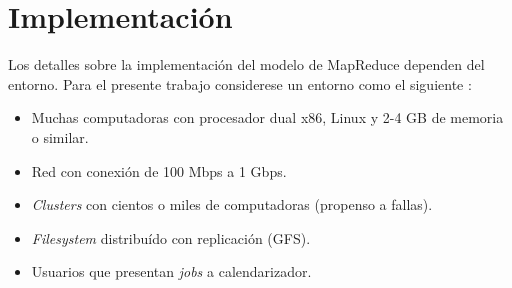 \documentclass[spanish]{article}
\begin{document}
\section{Implementación}
Los detalles sobre la implementación del modelo de MapReduce dependen del entorno. Para el presente trabajo considerese un entorno como el siguiente \cite{MapReduceGoogle}:
\begin{itemize}
   	\item Muchas computadoras con procesador dual x86, Linux y 2-4 GB de memoria o similar.
   	\item Red con conexión de 100 Mbps a 1 Gbps.
   	\item \textit{Clusters} con cientos o miles de computadoras (propenso a fallas).
   	\item \textit{Filesystem} distribuído con replicación (GFS).
   	\item Usuarios que presentan \textit{jobs} a calendarizador.
\end{itemize}
\end{document}
